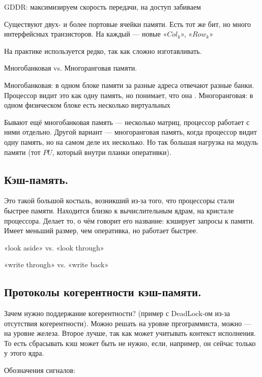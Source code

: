 \documentclass[12pt, a4paper]{article}
\begin{document}
GDDR: максимизируем скорость передачи, на доступ забиваем


Существуют двух- и более портовые ячейки памяти. Есть тот же бит, но много интерфейсных транзисторов.
На каждый — новые «$Col_k$», «$Row_k$»

На практике используется редко, так как сложно изготавливать. 

Многобанковая vs. Многоранговая памяти.

Многобанковая: в одном блоке памяти за разные адреса отвечают разные банки. Процессор видит это как одну память, но понимает, что она .
Многоранговая: в одном физическом блоке есть несколько виртуальных

Бывают ещё многобанковая память — несколько матриц, процессор работает с ними отдельно.
Другой вариант — многоранговая память, когда процессор видит одну память, но на самом деле их несколько.
Но так большая нагрузка на модуль памяти (тот $PU$, который внутри планки оперативки).



\subsection{Кэш-память.}

Это такой большой костыль, возникший из-за того, что процессоры стали быстрее памяти.
Находится близко к вычислительным ядрам, на кристале процессора.
Делает то, о чём говорит его название: кэширует запросы к памяти.
Имеет меньший размер, чем оперативка, но работает быстрее.

«look aside» vs. «look through»

«write through» vs. «write back»


\subsection{Протоколы когерентности кэш-памяти.}

Зачем нужно поддержание когерентности? (пример с DeadLock-ом из-за отсутствия когерентности).
Можно решать на уровне пргограммиста, можно — на уровне железа. 
Второе лучше, так как может учитывать контекст исполнения. 
То есть сбрасывать кэш может быть не нужно, если, например, он сейчас только у этого ядра.


Обозначения сигналов:
\end{document}
